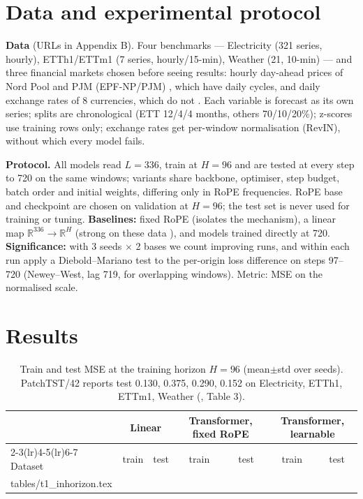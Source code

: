 \documentclass[12pt]{article}
\begin{document}
\section{Data and experimental protocol}
\textbf{Data} (URLs in Appendix B). Four benchmarks --- Electricity (321 series, hourly), ETTh1/ETTm1 (7 series, hourly/15-min), Weather (21, 10-min) --- and three financial markets chosen before seeing results: hourly day-ahead prices of Nord Pool and PJM (EPF-NP/PJM) \cite{lago2021}, which have daily cycles, and daily exchange rates of 8 currencies, which do not \cite{meese1983}.
Each variable is forecast as its own series; splits are chronological (ETT 12/4/4 months, others 70/10/20\%); z-scores use training rows only; exchange rates get per-window normalisation (RevIN), without which every model fails.

\textbf{Protocol.} All models read $L{=}336$, train at $H{=}96$ and are tested at every step to 720 on the same windows; variants share backbone, optimiser, step budget, batch order and initial weights, differing only in RoPE frequencies.
RoPE base and checkpoint are chosen on validation at $H{=}96$; the test set is never used for training or tuning.
\textbf{Baselines:} fixed RoPE (isolates the mechanism), a linear map $\mathbb{R}^{336}{\to}\mathbb{R}^H$ (strong on these data \cite{zeng2023dlinear}), and models trained directly at 720.
\textbf{Significance:} with 3 seeds $\times$ 2 bases we count improving runs, and within each run apply a Diebold--Mariano test \cite{diebold1995} to the per-origin loss difference on steps 97--720 (Newey--West, lag 719, for overlapping windows). Metric: MSE on the normalised scale.

\section{Results}
\begin{table}[t]\centering\small
\caption{Train and test MSE at the training horizon $H{=}96$ (mean$\pm$std over seeds). PatchTST/42 reports test 0.130, 0.375, 0.290, 0.152 on Electricity, ETTh1, ETTm1, Weather (\cite{nie2023patchtst}, Table 3).}
\label{tab:in}\setlength{\tabcolsep}{4pt}
\begin{tabular}{lcccccc}\toprule
& \multicolumn{2}{c}{Linear} & \multicolumn{2}{c}{Transformer, fixed RoPE} & \multicolumn{2}{c}{Transformer, learnable}\\
\cmidrule(lr){2-3}\cmidrule(lr){4-5}\cmidrule(lr){6-7}
Dataset & train & test & train & test & train & test\\\midrule
{} tables/t1_inhorizon.tex
\bottomrule\end{tabular}\end{table}
\end{document}

